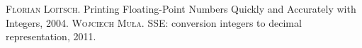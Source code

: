 \begin{thebibliography}{}

 \textsc{Florian Loitsch}.
Printing Floating-Point Numbers Quickly and Accurately with Integers, 2004.
 \textsc{Wojciech Mu\l a}.
SSE: conversion integers to decimal representation, 2011.


\end{thebibliography}
